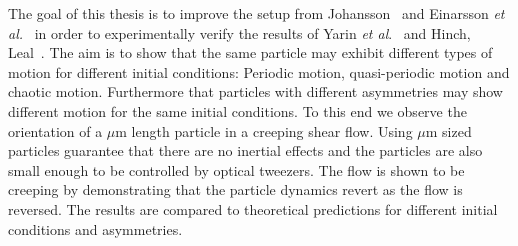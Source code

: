 The goal of this thesis is to improve the setup from Johansson~\cite{AntonThesis} and Einarsson \emph{et al.}~\cite{JonasExperiment} in order to experimentally verify the results of Yarin \emph{et al}.~\cite{Yarin} and Hinch, Leal~\cite{Leal}. The aim is to show that the same particle may exhibit different types of motion for different initial conditions: Periodic motion, quasi-periodic motion and chaotic motion. Furthermore that particles with different asymmetries may show different motion for the same initial conditions. To this end we observe the orientation of a $\mu$m length particle in a creeping shear flow. Using $\mu$m sized particles guarantee that there are no inertial effects and the particles are also small enough to be controlled by optical tweezers. The flow is shown to be creeping by demonstrating that the particle dynamics revert as the flow is reversed. The results are compared to theoretical predictions for different initial conditions and asymmetries.

